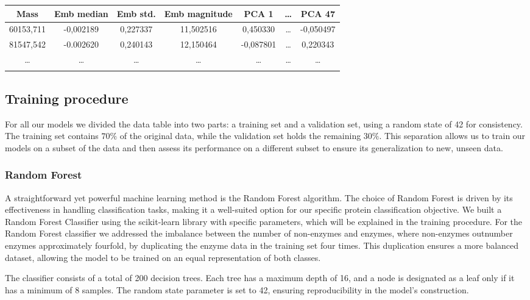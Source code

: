 \documentclass{bioinfo}
\begin{document}
\begin{methods}
\begin{table}[!htbp]
\setlength{\tabcolsep}{2pt}
 {
	\begin{tabular}{@{}ccccccc@{}}
		\toprule 
		Mass & Emb median & Emb std. & Emb magnitude & PCA 1 & \dots & PCA 47\\
		\midrule
		60153,711 & -0,002189 & 0,227337 & 11,502516 & 0,450330 & \dots & -0,050497\\
		81547,542 & -0.002620 & 0,240143 & 12,150464 & -0,087801 & \dots & 0,220343 \\
		\dots & \dots & \dots & \dots & \dots & \dots & \dots \\
		\botrule
    \end{tabular}
}{}
\end{table}

\subsection{Training procedure}
For all our models we divided the data table into two parts: a training set and a validation set, using a random state of 42 for consistency. 
The training set contains $70\%$ of the original data, while the validation set holds the remaining $30\%$. 
This separation allows us to train our models on a subset of the data and then assess its performance on a different subset to ensure its generalization to new, unseen data.

\subsubsection{Random Forest}
A straightforward yet powerful machine learning method is the Random Forest algorithm.
The choice of Random Forest is driven by its effectiveness in handling classification tasks, making it a well-suited option for our specific protein classification objective.
We built a Random Forest Classifier using the scikit-learn library with specific parameters, which will be explained in the training procedure. 
For the Random Forest classifier we addressed the imbalance between the number of non-enzymes and enzymes, where non-enzymes outnumber enzymes approximately fourfold,
by duplicating the enzyme data in the training set four times.
This duplication ensures a more balanced dataset, allowing the model to be trained on an equal representation of both classes.

The classifier consists of a total of 200 decision trees.
Each tree has a maximum depth of 16, and a node is designated as a leaf only if it has a minimum of 8 samples.
The random state parameter is set to 42, ensuring reproducibility in the model's construction.

\end{methods}
\end{document}
